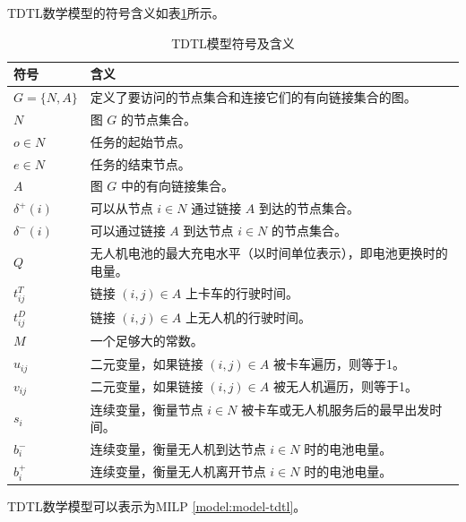 TDTL数学模型的符号含义如表\ref{tab:tdtl-sign-meaning}所示。

\begin{table}[!htbp]
    \centering
    \caption{TDTL模型符号及含义}
    \label{tab:tdtl-sign-meaning}
    \begin{tabularx}{\textwidth}{lX}
        \toprule[1pt]
        符号 & 含义 \\
        \midrule[0.75pt]
        $G = \{N, A\}$ & 定义了要访问的节点集合和连接它们的有向链接集合的图。 \\
        $N$ & 图 $G$ 的节点集合。 \\
        $o \in N$ & 任务的起始节点。 \\
        $e \in N$ & 任务的结束节点。 \\
        $A$ & 图 $G$ 中的有向链接集合。 \\
        $\delta^{+}(i)$ & 可以从节点 $i \in N$ 通过链接 $A$ 到达的节点集合。 \\
        $\delta^{-}(i)$ & 可以通过链接 $A$ 到达节点 $i \in N$ 的节点集合。 \\
        $Q$ & 无人机电池的最大充电水平（以时间单位表示），即电池更换时的电量。 \\
        $t_{ij}^{T}$ & 链接 $(i, j) \in A$ 上卡车的行驶时间。 \\
        $t_{ij}^{D}$ & 链接 $(i, j) \in A$ 上无人机的行驶时间。 \\
        $M$ & 一个足够大的常数。 \\
        $u_{ij}$ & 二元变量，如果链接 $(i, j) \in A$ 被卡车遍历，则等于1。 \\
        $v_{ij}$ & 二元变量，如果链接 $(i, j) \in A$ 被无人机遍历，则等于1。 \\
        $s_{i}$ & 连续变量，衡量节点 $i \in N$ 被卡车或无人机服务后的最早出发时间。 \\
        $b_{i}^{-}$ & 连续变量，衡量无人机到达节点 $i \in N$ 时的电池电量。 \\
        $b_{i}^{+}$ & 连续变量，衡量无人机离开节点 $i \in N$ 时的电池电量。 \\
        \bottomrule[1pt]
    \end{tabularx}
\end{table}

TDTL数学模型可以表示为MILP \ref{model:model-tdtl}。

